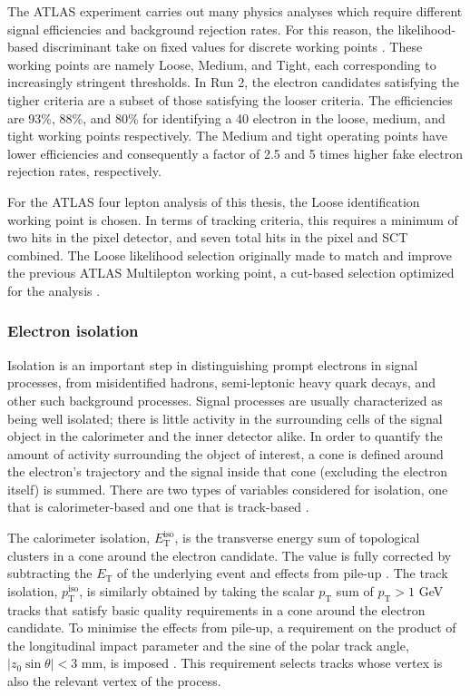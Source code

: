 The ATLAS experiment carries out many physics analyses which require different signal efficiencies and background rejection rates. For this reason, the likelihood-based discriminant take on fixed values for discrete working points \cite{ATLAS_electron_efficiency_2015-2016}. These working points are namely Loose, Medium, and Tight, each corresponding to increasingly stringent thresholds. In Run 2, the electron candidates satisfying the tigher criteria are a subset of those satisfying the looser criteria. The efficiencies are 93\%, 88\%, and 80\% for identifying a \unit{40}{\GeV} electron in the loose, medium, and tight working points respectively. The Medium and tight operating points have lower efficiencies and consequently a factor of 2.5 and 5 times higher fake electron rejection rates, respectively. 

For the ATLAS four lepton analysis of this thesis, the Loose identification working point is chosen. In terms of tracking criteria, this requires a minimum of two hits in the pixel detector, and seven total hits in the pixel and SCT combined. The Loose likelihood selection originally made to match and improve the previous ATLAS Multilepton working point, a cut-based selection optimized for the \HFourL{} analysis \cite{ATLAS_muon_reco_2011}.

\subsubsection{Electron isolation}

Isolation is an important step in distinguishing prompt electrons in signal processes, from misidentified hadrons, semi-leptonic heavy quark decays, and other such background processes. Signal processes are usually characterized as being well isolated; there is little activity in the surrounding cells of the signal object in the calorimeter and the inner detector alike. In order to quantify the amount of activity surrounding the object of interest, a cone is defined around the electron's trajectory and the signal inside that cone (excluding the electron itself) is summed. There are two types of variables considered for isolation, one that is calorimeter-based and one that is track-based \cite{ATLAS_electron_efficiency_2015-2016}. 

The calorimeter isolation, $E_{\text{T}}^{\text{iso}}$, is the transverse energy sum of topological clusters in a cone around the electron candidate. The value is fully corrected by subtracting the $E_{\text{T}}$ of the underlying event and effects from pile-up \cite{ATLAS_electron_photon_triggers_run2, ATLAS_electron_efficiency_2015-2016}. The track isolation, $p_{\text{T}}^{\text{iso}}$, is similarly obtained by taking the scalar $p_{\text{T}}$ sum of $p_{\text{T}}>1$ GeV tracks that satisfy basic quality requirements in a cone around the electron candidate. To minimise the effects from pile-up, a requirement on the product of the longitudinal impact parameter and the sine of the polar track angle, $|z_0\sin\theta|<3$ mm, is imposed \cite{ATLAS_electron_efficiency_2015-2016}. This requirement selects tracks whose vertex is also the relevant vertex of the process. 

